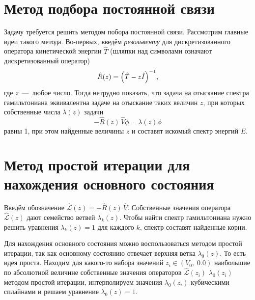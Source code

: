 \documentclass[10pt]{article}
\begin{document}
\section{Метод подбора постоянной связи}

Задачу требуется решить методом побора постоянной связи. Рассмотрим главные идеи такого метода. Во-первых, введём \emph{резольвенту} для дискретизованного оператора кинетической энергии  $\hat T$ (шляпки над символами означают дискретизованный оператор)
\begin{equation}
 \hat R(z) = \qty(\hat T - z \hat I)^{-1},
\end{equation}
где $z$~---~любое число. Тогда нетрудно показать, что задача на отыскание спектра гамильтониана эквивалентна задаче на отыскание таких величин $z$, при которых собственные числа $\lambda(z)$ задачи
\begin{equation}
 - \hat R(z)\, \hat V \phi = \lambda(z) \phi
\end{equation}
равны 1, при этом найденные величины $z$ и составят искомый спектр энергий $E$.

\section{Метод простой итерации для нахождения основного состояния}

Введём обозначение $ \hat{\mathcal{L}}(z) = - \hat R(z)\, \hat V$. Собственные значения оператора $\hat{\mathcal{L}}(z)$ дают семейство ветвей $\lambda_k(z)$. Чтобы найти спектр гамильтониана нужно решить уравнения $\lambda_k(z)=1$ для каждого $k$, спектр составят найденные корни.

Для нахождения основного состояния можно воспользоваться методом простой итерации, так как основному состоянию отвечает верхняя ветка  $\lambda_0(z)$. То есть идея проста. Находим для какого-то набора значений ${z_i} \in (V_0,\; 0.0)$ наибольшие по абсолютной величине собственные значения операторов $\hat{\mathcal{L}}(z_i)$ $\lambda_0(z_i)$ методом простой итерации, интерполируем значения $\lambda_0(z_i)$ кубическими сплайнами и решаем уравнение $\lambda_0(z)=1$.
\end{document}
